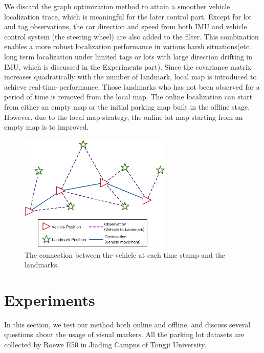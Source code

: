 \documentclass[journal]{IEEEtran}
\begin{document}
We discard the graph optimization method to attain a smoother vehicle localization trace, which is meaningful for the later control part. 
Except for lot and tag observations, the car direction and speed from both IMU and vehicle control system (the steering wheel) are also added to the filter. 
This combination enables a more robust localization performance in various harsh situations(etc. long term localization under limited tags or lots with large direction drifting in IMU, which is discussed in the Experiments part). 
Since the covariance matrix increases quadratically with the number of landmark\cite{Bailey2006Simultaneous}, local map is introduced to achieve real-time performance. 
Those landmarks who has not been observed for a period of time is removed from the local map. 
The online localization can start from either an empty map or the initial parking map built in the offline stage. 
However, due to the local map strategy, the online lot map starting from an empty map is to improved.

\begin{figure}
\centering
\includegraphics[height = 2.2in]{pic/fig9_Optimize}
\caption{
The connection between the vehicle at each time stamp and the landmarks.
}\label{fig:9}
\end{figure}



\section{Experiments}
In this section, we test our method both online and offline, and discuss several questions about the usage of visual markers. 
All the parking lot datasets are collected by Roewe E50 in Jiading Campus of Tongji University.
\end{document}
